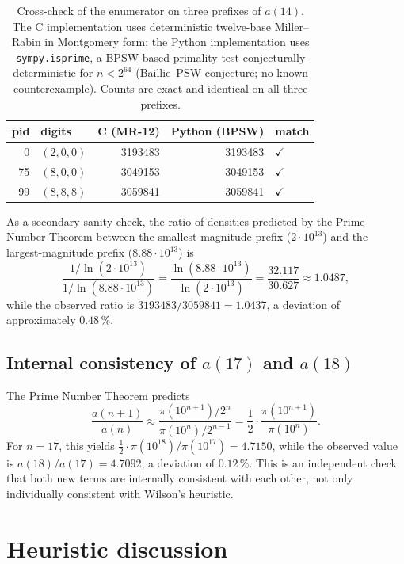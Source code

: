 \documentclass[11pt,a4paper]{article}
\theoremstyle{definition}
\begin{document}
\begin{table}[ht]
  \centering
  \begin{tabular}{r l r r l}
    \toprule
    pid & digits  & C (MR-12)            & Python (BPSW)        & match\\
    \midrule
      0 & $(2,0,0)$ & \num{3193483} & \num{3193483} & $\checkmark$\\
     75 & $(8,0,0)$ & \num{3049153} & \num{3049153} & $\checkmark$\\
     99 & $(8,8,8)$ & \num{3059841} & \num{3059841} & $\checkmark$\\
    \bottomrule
  \end{tabular}
  \caption{Cross-check of the enumerator on three prefixes of $a(14)$.
    The C implementation uses deterministic twelve-base Miller--Rabin in
    Montgomery form; the Python implementation uses
    \texttt{sympy.isprime}, a BPSW-based primality test conjecturally
    deterministic for $n < 2^{64}$ (Baillie--PSW conjecture; no known
    counterexample). Counts are exact and identical on all three prefixes.}
  \label{tab:python-crosscheck}
\end{table}

As a secondary sanity check, the ratio of densities predicted by the Prime
Number Theorem between the smallest-magnitude prefix ($2\cdot 10^{13}$)
and the largest-magnitude prefix ($8.88\cdot 10^{13}$) is
\[
  \frac{1/\ln(2 \cdot 10^{13})}{1/\ln(8.88 \cdot 10^{13})}
  = \frac{\ln(8.88 \cdot 10^{13})}{\ln(2 \cdot 10^{13})}
    = \frac{32.117}{30.627}
    \approx 1.0487,
\]
while the observed ratio is $\num{3193483}/\num{3059841} = 1.0437$, a
deviation of approximately $0.48\,\%$.

\subsection{Internal consistency of \texorpdfstring{$a(17)$}{a(17)} and \texorpdfstring{$a(18)$}{a(18)}}

The Prime Number Theorem predicts
\[
  \frac{a(n+1)}{a(n)} \approx
    \frac{\pi(10^{n+1})/2^{n}}{\pi(10^{n})/2^{n-1}} =
    \frac{1}{2}\cdot\frac{\pi(10^{n+1})}{\pi(10^{n})}.
\]
For $n = 17$, this yields $\tfrac{1}{2} \cdot \pi(10^{18})/\pi(10^{17}) = 4.7150$,
while the observed value is $a(18)/a(17) = 4.7092$, a deviation of
$0.12\,\%$. This is an independent check that both new terms are
internally consistent with each other, not only individually consistent
with Wilson's heuristic.

\section{Heuristic discussion}\label{sec:heur}
\end{document}
